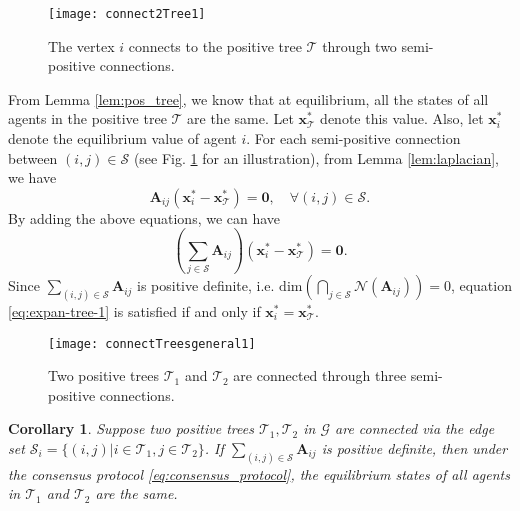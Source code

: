 \documentclass[draftclsnofoot,11pt,onecolumn]{IEEEtran}
\newtheorem{Corollary}{Corollary}
\newcommand{\m}[1]{\mathbf{#1}}
\newcommand{\mc}[1]{\mathcal{#1}}
\begin{document}
\begin{IEEEproof}
\begin{figure}[b]
  \centering
  \texttt{[image: connect2Tree1]}
  \caption{The vertex $i$ connects to the positive tree $\mc{T}$ through two semi-positive connections.}
  \label{fig:connect_tree}
\end{figure}
From Lemma \ref{lem:pos_tree}, we know that at equilibrium, all the states of all agents in the positive tree $\mc{T}$ are the same. Let $\m{x}^*_{\mc{T}}$ denote this value. Also, let $\m{x}_i^*$ denote the equilibrium value of agent $i$. For each semi-positive connection between $(i,j) \in \mc{S}$ (see Fig. \ref{fig:connect_tree} for an illustration), from Lemma \ref{lem:laplacian}, we have
\begin{equation*}
\m{A}_{ij} (\m{x}_i^* - \m{x}_{\mc{T}}^*) = \m{0}, \quad \forall (i,j) \in \mc{S}.
\end{equation*}
By adding the above equations, we can have
\begin{equation} \label{eq:expan-tree-1}
\left(\sum_{j \in \mc{S}} \m{A}_{ij} \right) (\m{x}_i^* - \m{x}_{\mc{T}}^*) = \m{0}.
\end{equation}
Since $\sum_{(i,j) \in \mc{S}} \m{A}_{ij}$ is positive definite, i.e. $\text{dim}(\bigcap_{j\in \mc{S}} \mc{N}(\m{A}_{ij}))=0$, equation  \eqref{eq:expan-tree-1} is satisfied if and only if $\m{x}_i^* = \m{x}_{\mc{T}}^*$.
\end{IEEEproof}

\begin{figure}[b]
\begin{center}
\texttt{[image: connectTreesgeneral1]}
\caption{Two positive trees $\mc{T}_1$ and $\mc{T}_2$ are connected through three semi-positive connections.}
\label{fig:two_trees}
\end{center}
\end{figure}
\begin{Corollary} \label{cor:EPT} Suppose two positive trees $\mc{T}_1, \mc{T}_2$ in  $\mc{G}$ are connected via the edge set $\mc{S}_i = \{ (i,j)|i \in \mc{T}_1, j \in \mc{T}_2 \}$. If $\sum_{(i,j) \in \mc{S}} \m{A}_{ij}$ is positive definite, then under the consensus protocol \eqref{eq:consensus_protocol}, the equilibrium states of all agents in $\mc{T}_1$ and $\mc{T}_2$ are the same.
\end{Corollary}
\end{document}
